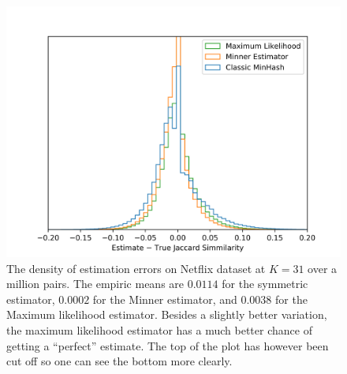 \begin{figure}
   \centering
   \includegraphics[trim=0 5 35 40,clip,width=\linewidth]{figures/hist2}
\caption{The density of estimation errors on Netflix dataset at $K=31$ over a million pairs.
   The empiric means are $0.0114$ for the symmetric estimator, 
$0.0002$ for the Minner estimator, and 
$0.0038$ for the Maximum likelihood estimator.
Besides a slightly better variation, the maximum likelihood estimator has a much better chance of getting a ``perfect'' estimate.
The top of the plot has however been cut off so one can see the bottom more clearly.
}
\end{figure}

